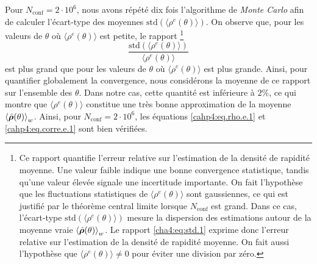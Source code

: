 \smallskip

Pour \(N_{\text{conf}} = 2\cdot 10^6\), nous avons répété dix fois l’algorithme de \emph{Monte Carlo} afin de calculer l’écart-type des moyennes \(\mathrm{std}(\langle \rho^e(\theta) \rangle)\).
On observe que, pour les valeurs de \(\theta\) où \(\langle \rho^e(\theta) \rangle\) est petite, le rapport 
\footnote{Ce rapport quantifie l’erreur relative sur l’estimation de la densité de rapidité moyenne. Une valeur faible indique une bonne convergence statistique, tandis qu’une valeur élevée signale une incertitude importante.
On fait l'hypothèse que les fluctuations statistiques de \(\langle \rho^e(\theta) \rangle\) sont gaussiennes, ce qui est justifié par le théorème central limite lorsque \(N_{\text{conf}}\) est grand. Dans ce cas, l’écart-type \(\mathrm{std}(\langle \rho^e(\theta) \rangle)\) mesure la dispersion des estimations autour de la moyenne vraie \(\braket{\hat{\bm{\rho}}(\theta)}_w\). Le rapport \eqref{cha4:eq:std.1} exprime donc l’erreur relative sur l’estimation de la densité de rapidité moyenne. On fait aussi l'hypothèse que $\langle \rho^e(\theta) \rangle \neq 0 $ pour éviter une division par zéro.}
\begin{equation}\label{cha4:eq:std.1}
	\frac{\mathrm{std}(\langle \rho^e(\theta) \rangle)}{\langle \rho^e(\theta) \rangle}
\end{equation}
est plus grand que pour les valeurs de \(\theta\) où \(\langle \rho^e(\theta) \rangle\) est plus grande.
Ainsi, pour quantifier globalement la convergence, nous considérons la moyenne de ce rapport sur l’ensemble des \(\theta\).
Dans notre cas, cette quantité est inférieure à \(2\%\), ce qui montre que \(\langle \rho^e(\theta) \rangle\) constitue une très bonne approximation de la moyenne \(\braket{\hat{\bm{\rho}}(\theta)}_w\). Ainsi, pour \( N_{\text{conf}} = 2\cdot 10^6 \), les équations \eqref{cahp4:eq.rho.e.1} et \eqref{cahp4:eq.corre.e.1} sont bien vérifiées.

\medskip


